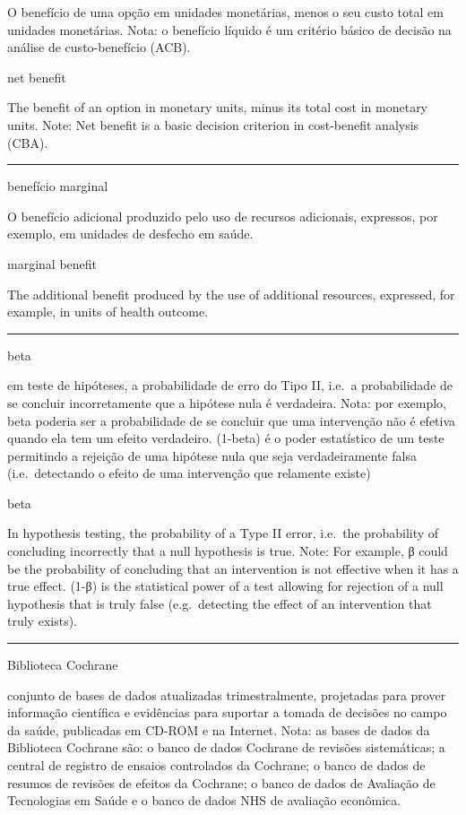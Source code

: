 \documentclass[
]{book}
\begin{document}
O benefício de uma opção em unidades monetárias, menos o seu custo total em unidades monetárias. Nota: o benefício líquido é um critério básico de decisão na análise de custo-benefício (ACB).

net benefit

The benefit of an option in monetary units, minus its total cost in monetary units. Note: Net benefit is a basic decision criterion in cost-benefit analysis (CBA).

\begin{center}\rule{0.5\linewidth}{0.5pt}\end{center}

benefício marginal

O benefício adicional produzido pelo uso de recursos adicionais, expressos, por exemplo, em unidades de desfecho em saúde.

marginal benefit

The additional benefit produced by the use of additional resources, expressed, for example, in units of health outcome.

\begin{center}\rule{0.5\linewidth}{0.5pt}\end{center}

beta

em teste de hipóteses, a probabilidade de erro do Tipo II, i.e.~a probabilidade de se concluir incorretamente que a hipótese nula é verdadeira. Nota: por exemplo, beta poderia ser a probabilidade de se concluir que uma intervenção não é efetiva quando ela tem um efeito verdadeiro. (1-beta) é o poder estatístico de um teste permitindo a rejeição de uma hipótese nula que seja verdadeiramente falsa (i.e.~detectando o efeito de uma intervenção que relamente existe)

beta

In hypothesis testing, the probability of a Type II error, i.e.~the probability of concluding incorrectly that a null hypothesis is true. Note: For example, β could be the probability of concluding that an intervention is not effective when it has a true effect. (1-β) is the statistical power of a test allowing for rejection of a null hypothesis that is truly false (e.g.~detecting the effect of an intervention that truly exists).

\begin{center}\rule{0.5\linewidth}{0.5pt}\end{center}

Biblioteca Cochrane

conjunto de bases de dados atualizadas trimestralmente, projetadas para prover informação científica e evidências para suportar a tomada de decisões no campo da saúde, publicadas em CD-ROM e na Internet. Nota: as bases de dados da Biblioteca Cochrane são: o banco de dados Cochrane de revisões sistemáticas; a central de registro de ensaios controlados da Cochrane; o banco de dados de resumos de revisões de efeitos da Cochrane; o banco de dados de Avaliação de Tecnologias em Saúde e o banco de dados NHS de avaliação econômica.
\end{document}
